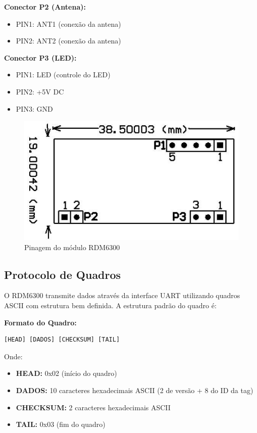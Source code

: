 \textbf{Conector P2 (Antena):}
\begin{itemize}
\item PIN1: ANT1 (conexão da antena)
\item PIN2: ANT2 (conexão da antena)
\end{itemize}

\textbf{Conector P3 (LED):}
\begin{itemize}
\item PIN1: LED (controle do LED)
\item PIN2: +5V DC
\item PIN3: GND
\end{itemize}

\begin{figure}[htbp!] \begin{center}
  \includegraphics[width=0.4\linewidth]{pre-textuais/figuras/Pinagem_RDM6300}
  \caption{Pinagem do módulo RDM6300}
  \label{Fig:PinagemRDM6300}
  \end{center} \end{figure}

\subsection{Protocolo de Quadros}

O RDM6300 transmite dados através da interface UART utilizando quadros ASCII com estrutura bem definida. A estrutura padrão do quadro é:

\textbf{Formato do Quadro:}
\begin{verbatim}
[HEAD] [DADOS] [CHECKSUM] [TAIL]
\end{verbatim}

Onde:
\begin{itemize}
\item \textbf{HEAD:} 0x02 (início do quadro)
\item \textbf{DADOS:} 10 caracteres hexadecimais ASCII (2 de versão + 8 do ID da tag)
\item \textbf{CHECKSUM:} 2 caracteres hexadecimais ASCII
\item \textbf{TAIL:} 0x03 (fim do quadro)
\end{itemize}

